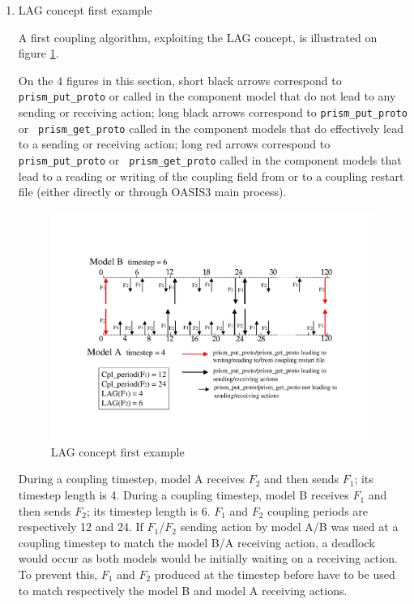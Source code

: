   \begin{enumerate}

  \item LAG concept first example
 
  A first coupling algorithm, exploiting the LAG concept, is
  illustrated on figure \ref{fig:lag_concept_1}. 


  On the 4 figures in this section, short black arrows correspond to {\tt
  prism\_put\_proto} or  called in the component model
  that do not lead to any sending or receiving action;
  long black arrows correspond to {\tt prism\_put\_proto} or {\tt
  prism\_get\_proto} called in the component models that do
  effectively lead to a sending or receiving action;
  long red arrows correspond to {\tt prism\_put\_proto} or {\tt
  prism\_get\_proto} called in the component models that lead to a
  reading or writing of the coupling field from or to a coupling
  restart file (either directly or through OASIS3 main process).

\begin{figure}
\includegraphics[scale=.6]{figures/fig_lag_concept_1}
\caption{LAG concept first example} 
\label{fig:lag_concept_1}
\end{figure}

  During a coupling timestep, model A receives $F_2$ and then sends $F_1$; its
  timestep length is 4. During a coupling timestep, model B receives $F_1$
  and then sends $F_2$; its timestep length is 6.  $F_1$ and $F_2$
  coupling periods are respectively 12 and 24. If $F_1$/$F_2$ sending
  action by model A/B was used at a coupling timestep to match the
  model B/A receiving action, a deadlock would occur as both models
  would be initially waiting on a receiving action. To prevent this,
  $F_1$ and $F_2$ produced at the timestep before have to be used to
  match respectively the model B and model A receiving actions.


\end{enumerate}
